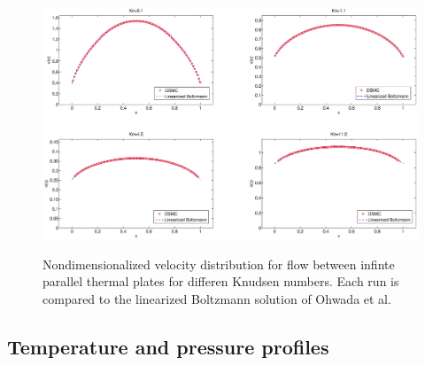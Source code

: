 \begin{figure}[h]
\includegraphics[width=\textwidth, trim=6cm 0cm 5cm 0cm, clip]{DSMC/figures/validation_poiseuille.eps}
\label{fig:dsmc_validation_poiseuille}
\centering
\caption{Nondimensionalized velocity distribution for flow between infinte parallel thermal plates for differen Knudsen numbers. Each run is compared to the linearized Boltzmann solution of Ohwada et al.}
\end{figure}
\subsection{Temperature and pressure profiles}
